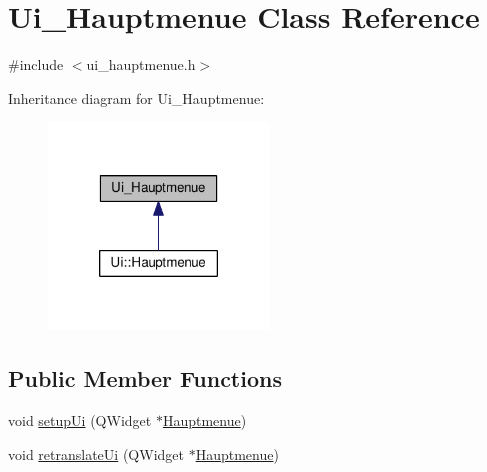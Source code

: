 \hypertarget{classUi__Hauptmenue}{\section{Ui\-\_\-\-Hauptmenue Class Reference}
\label{classUi__Hauptmenue}
}


{\ttfamily \#include $<$ui\-\_\-hauptmenue.\-h$>$}



Inheritance diagram for Ui\-\_\-\-Hauptmenue\-:\nopagebreak
\begin{figure}[H]
\begin{center}
\leavevmode
\includegraphics[width=166pt]{classUi__Hauptmenue__inherit__graph}
\end{center}
\end{figure}
\subsection*{Public Member Functions}
\begin{DoxyCompactItemize}
\item 
void \hyperlink{classUi__Hauptmenue_a11efe98d9aa47edcaf88556426389984}{setup\-Ui} (Q\-Widget $\ast$\hyperlink{classHauptmenue}{Hauptmenue})
\item 
void \hyperlink{classUi__Hauptmenue_a12ba158e5fcfbb118f2fe7ad42ec125c}{retranslate\-Ui} (Q\-Widget $\ast$\hyperlink{classHauptmenue}{Hauptmenue})
\end{DoxyCompactItemize}

